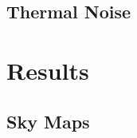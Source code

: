 \documentclass[twocolumn]{aastex6}
\begin{document}
\subsection{Thermal Noise}

\section{Results}

\subsection{Sky Maps}

%
%
\end{document}
